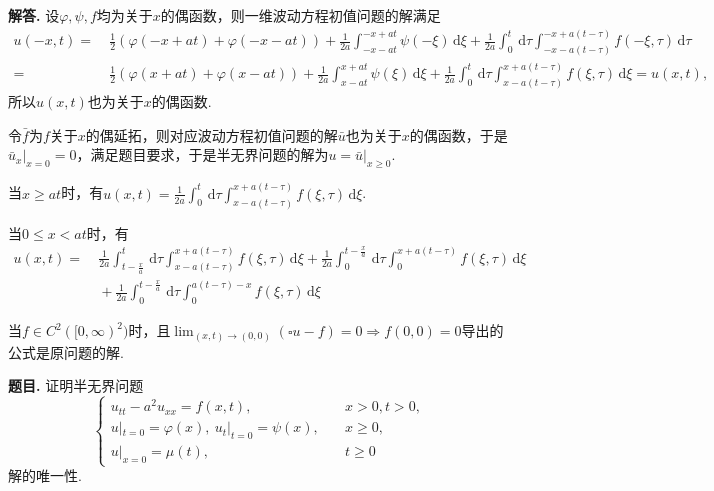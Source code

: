 \documentclass[12pt, a4paper, oneside]{ctexart}
\newcounter{problem}  %
\newenvironment{problem}{\stepcounter{problem}\par\noindent\textbf{题目\arabic{problem}. }}{\smallskip\par}
\newenvironment{solution}{\par\noindent\textbf{解答. }}{\smallskip\par}
\let\leq=\leqslant %
\let\geq=\geqslant %
\def\d{\mathrm{d}}          %
\begin{document}
\begin{solution}
    设$\varphi,\psi,f$均为关于$x$的偶函数，则一维波动方程初值问题的解满足
    \begin{align*}
        u(-x,t) =&\ \frac{1}{2}(\varphi(-x+at)+\varphi(-x-at))+\frac{1}{2a}\int_{-x-at}^{-x+at}\psi(-\xi)\,\d \xi+\frac{1}{2a}\int_0^t\,\d \tau\int_{-x-a(t-\tau)}^{-x+a(t-\tau)}f(-\xi,\tau)\,\d\tau\\
        =&\ \frac{1}{2}(\varphi(x+at)+\varphi(x-at))+\frac{1}{2a}\int_{x-at}^{x+at}\psi(\xi)\,\d\xi+\frac{1}{2a}\int_0^t\,\d\tau\int_{x-a(t-\tau)}^{x+a(t-\tau)}f(\xi,\tau)\,\d\xi = u(x,t),
    \end{align*}
    所以$u(x,t)$也为关于$x$的偶函数.

    令$\bar{f}$为$f$关于$x$的偶延拓，则对应波动方程初值问题的解$\bar{u}$也为关于$x$的偶函数，于是$\bar{u}_x|_{x=0} = 0$，满足题目要求，于是半无界问题的解为$u = \bar{u}|_{x \geq 0}$.

    当$x\geq at$时，有$u(x,t)  =\frac{1}{2a}\int_0^t\,\d \tau\int_{x-a(t-\tau)}^{x+a(t-\tau)}f(\xi,\tau)\,\d\xi$.

    当$0\leq x < at$时，有
    \begin{align*}
        u(x,t) =&\ \frac{1}{2a}\int_{t-\frac{x}{a}}^t\,\d \tau\int_{x-a(t-\tau)}^{x+a(t-\tau)}f(\xi,\tau)\,\d\xi+\frac{1}{2a}\int_{0}^{t-\frac{x}{a}}\,\d \tau\int_{0}^{x+a(t-\tau)}f(\xi,\tau)\,\d\xi\\
        &\ +\frac{1}{2a}\int_{0}^{t-\frac{x}{a}}\,\d \tau\int_{0}^{a(t-\tau)-x}f(\xi,\tau)\,\d\xi
    \end{align*}

    当$f\in C^2([0,\infty)^2)$时，且$\lim_{(x,t)\to(0,0)}(\square u-f) = 0\Rightarrow f(0,0) = 0$导出的公式是原问题的解.
\end{solution}
\begin{problem}
    证明半无界问题
    \begin{equation*}
        \begin{cases}
            u_{tt}-a^2u_{xx}=f(x,t),&\quad x > 0, t > 0,\\
            u|_{t=0}=\varphi(x),\ u_t|_{t=0}=\psi(x),&\quad x\geq 0,\\
            u|_{x=0} = \mu(t),&\quad t\geq 0
        \end{cases}
    \end{equation*}
    解的唯一性.
\end{problem}
\end{document}
